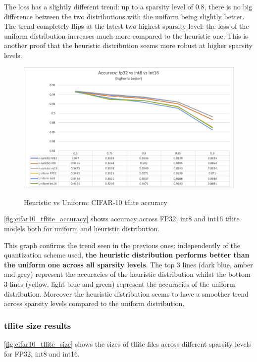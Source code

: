The loss has a slightly different trend: up to a sparsity level of 0.8, there
is no big difference between the two distributions with the uniform being
slightly better.
The trend completely flips at the latest two highest sparsity level: the loss
of the uniform distribution increases much more compared to the heuristic one.
This is another proof that the heuristic distribution seems more robust at
higher sparsity levels.

\begin{figure}[ht]
    \centering
    {\includegraphics[width=.8\linewidth]{images/results/cifar10_tflite_accuracy.png}}
    \caption{Heuristic vs Uniform: CIFAR-10 tflite accuracy}\label{fig:cifar10_tflite_accuracy}
\end{figure}

\autoref{fig:cifar10_tflite_accuracy} shows accuracy across FP32, int8 and
int16 tflite models both for uniform and heuristic distribution.

This graph confirms the trend seen in the previous ones: independently of the
quantization scheme used, \textbf{the heuristic distribution performs better
than the uniform one across all sparsity levels}.
The top 3 lines (dark blue, amber and grey) represent the accuracies of the
heuristic distribution whilst the bottom 3 lines (yellow, light blue and green)
represent the accuracies of the uniform distribution.
Moreover the heuristic distribution seems to have a smoother trend across
sparsity levels compared to the uniform distribution.

\subsubsection{tflite size results}\label{subsub:tflite_size_results}
\autoref{fig:cifar10_tflite_size} shows the sizes of tflite files across
different sparsity levels for FP32, int8 and int16.

